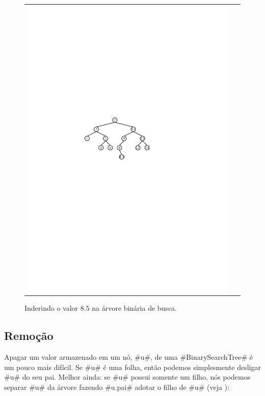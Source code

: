 \begin{figure}
\begin{center}
\begin{tabular}{cc}
    \includegraphics[width=\HalfScaleIfNeeded]{figs/bst-example-5} 
    \end{tabular}
  \end{center}
  \caption{Inderindo o valor $8.5$ na árvore binária de busca.}
\end{figure}


\subsection{Remoção}

Apagar um valor armazenado em um nó, #u#, de uma #BinarySearchTree# é um pouco mais difícil.  Se #u# é uma folha, então podemos simplesmente desligar #u# do seu pai.  Melhor ainda: se #u# possui somente um filho, nós podemos separar #u# da árvore fazendo #u.pai# adotar o filho de #u# (veja
):

